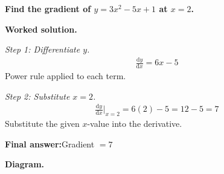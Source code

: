 \documentclass[11pt]{article}
\newcommand{\question}[1]{\par\medskip\noindent\textbf{#1}\par}
\begin{document}
\question{Find the gradient of \( y = 3x^2 - 5x + 1 \) at \( x = 2 \).}

\textbf{Worked solution.}

\textit{Step 1: Differentiate \( y \).}
\[\begin{gathered}
\frac{\mathrm{d}y}{\mathrm{d}x} = 6x - 5
\end{gathered}\]
Power rule applied to each term.

\textit{Step 2: Substitute \( x = 2 \).}
\[\begin{gathered}
\frac{\mathrm{d}y}{\mathrm{d}x}\bigg|_{x=2} = 6(2) - 5 = 12 - 5 = 7
\end{gathered}\]
Substitute the given \( x \)-value into the derivative.

\begin{answerbox}
\textbf{Final answer:}\quad Gradient \(\displaystyle  = 7 \)
\end{answerbox}
\textbf{Diagram.}
\end{document}
